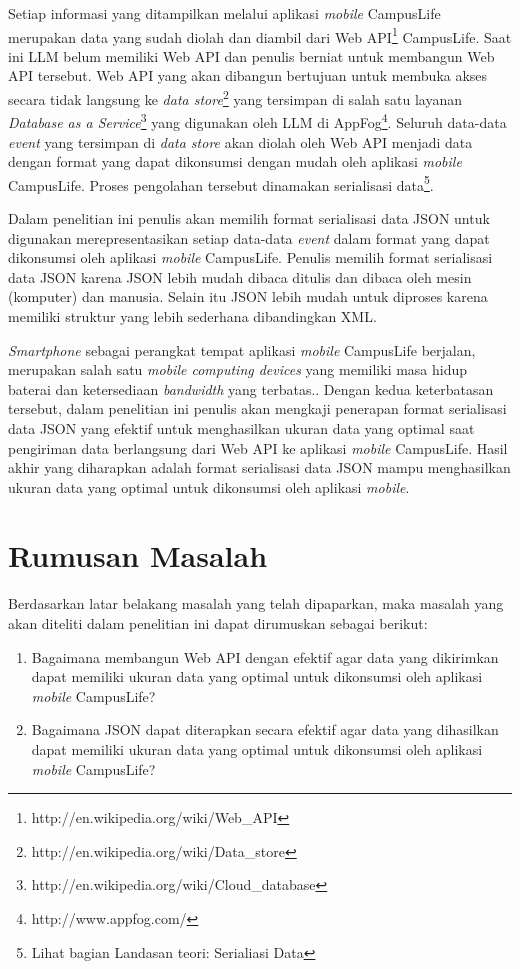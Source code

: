 \documentclass[a4paper, 12pt, oneside]{report}
\begin{document}
\onehalfspacing Setiap informasi yang ditampilkan melalui aplikasi \textit{mobile} CampusLife merupakan data yang sudah diolah dan diambil dari Web API\footnote{http://en.wikipedia.org/wiki/Web\_API} CampusLife. Saat ini LLM belum memiliki Web API dan penulis berniat untuk membangun Web API tersebut. Web API yang akan dibangun bertujuan untuk membuka akses secara tidak langsung ke \textit{data store}\footnote{http://en.wikipedia.org/wiki/Data\_store} yang tersimpan di salah satu layanan \textit{Database as a Service}\footnote{http://en.wikipedia.org/wiki/Cloud\_database} yang digunakan oleh LLM di AppFog\footnote{http://www.appfog.com/}. Seluruh data-data \textit{event} yang tersimpan di \textit{data store} akan diolah oleh Web API menjadi data dengan format yang dapat dikonsumsi dengan mudah oleh aplikasi \textit{mobile} CampusLife. Proses pengolahan tersebut dinamakan serialisasi data\footnote{Lihat bagian Landasan teori: Serialiasi Data}.

\onehalfspacing Dalam penelitian ini penulis akan memilih format serialisasi data JSON untuk digunakan merepresentasikan setiap data-data \textit{event} dalam format yang dapat dikonsumsi oleh aplikasi \textit{mobile} CampusLife. Penulis memilih format serialisasi data JSON karena JSON lebih mudah dibaca ditulis dan dibaca oleh mesin (komputer) dan manusia. Selain itu JSON lebih mudah untuk diproses karena memiliki struktur yang lebih sederhana dibandingkan XML\cite{json-fat-free}\cite{json-vs-xml-debate}.

\onehalfspacing \textit{Smartphone} sebagai perangkat tempat aplikasi \textit{mobile} CampusLife berjalan, merupakan salah satu \textit{mobile computing devices} yang memiliki masa hidup baterai dan ketersediaan \textit{bandwidth} yang terbatas.\cite{challenging-issues-and-limitations-of-mobile-computing}. Dengan kedua keterbatasan tersebut, dalam penelitian ini penulis akan mengkaji penerapan format serialisasi data JSON yang efektif untuk menghasilkan ukuran data yang optimal saat pengiriman data berlangsung dari Web API ke aplikasi \textit{mobile} CampusLife. Hasil akhir yang diharapkan adalah format serialisasi data JSON mampu menghasilkan ukuran data yang optimal untuk dikonsumsi oleh aplikasi \textit{mobile}.

\section{Rumusan Masalah}
\onehalfspacing Berdasarkan latar belakang masalah yang telah dipaparkan, maka masalah yang akan diteliti dalam penelitian ini dapat dirumuskan sebagai berikut:
\begin{enumerate}
  \item Bagaimana membangun Web API dengan efektif agar data yang dikirimkan dapat memiliki ukuran data yang optimal untuk dikonsumsi oleh aplikasi \textit{mobile} CampusLife?
  \item Bagaimana JSON dapat diterapkan secara efektif agar data yang dihasilkan dapat memiliki ukuran data yang optimal untuk dikonsumsi oleh aplikasi \textit{mobile} CampusLife?
\end{enumerate}
\end{document}
